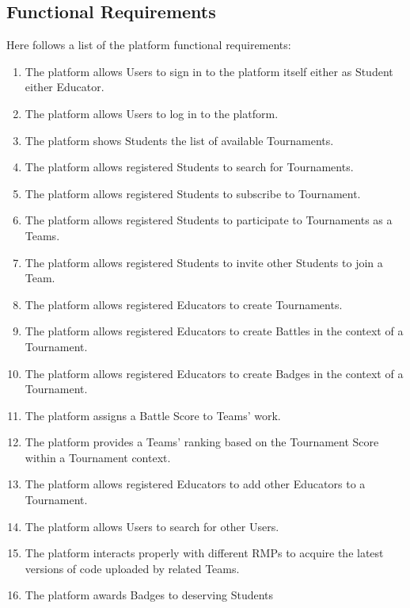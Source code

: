 \subsection{Functional Requirements}
Here follows a list of the platform functional requirements:
\begin{enumerate}[label= \textbf{R\arabic*}]
    \item The platform allows Users to sign in to the platform itself either as Student either Educator. \label{req:reqSignin}
    \item The platform allows Users to log in to the platform. \label{req:reqLogin}
    \item The platform shows Students the list of available Tournaments. \label{req:reqShowTournaments}
    \item The platform allows registered Students to search for Tournaments. \label{req:reqSearchForTournament}
    \item The platform allows registered Students to subscribe to Tournament. \label{req:reqTournamentSubscription}
    \item The platform allows registered Students to participate to Tournaments as a Teams. \label{req:reqCreateTeam}
    \item The platform allows registered Students to invite other Students to join a Team. \label{req:reqJoinTeam}
    \item The platform allows registered Educators to create Tournaments. \label{req:reqCreateTournaments}
    \item The platform allows registered Educators to create Battles in the context of a Tournament. \label{req:reqCreateBattle}
    \item The platform allows registered Educators to create Badges in the context of a Tournament. \label{req:reqCreateBadge}
    \item The platform assigns a Battle Score to Teams' work. \label{req:reqEvaluateCode}
    \item The platform provides a Teams' ranking based on the Tournament Score within a Tournament context. \label{req:reqRankingsUpdate}
    \item The platform allows registered Educators to add other Educators to a Tournament. \label{req:reqJoinManagement}
    \item The platform allows Users to search for other Users. \label{req:reqSearchForUsers}
    \item The platform interacts properly with different RMPs to acquire the latest versions of code uploaded by related Teams. \label{req:reqPullRMP}
    \item The platform awards Badges to deserving Students \label{req:reqAssignBadge}
\end{enumerate}

